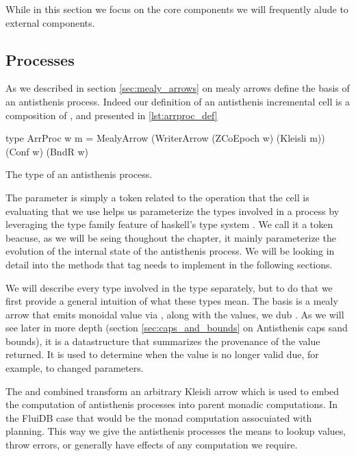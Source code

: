 While in this section we focus on the core components we will
frequently alude to external components.

\subsection{Processes}

As we described in section \ref{sec:mealy_arrows} on mealy arrows
define the basis of an antisthenis process. Indeed our definition of
an antisthenis incremental cell is a composition of ,
 and  presented in
\ref{lst:arrproc_def}

\begin{code}
\begin{haskellcode}
type ArrProc w m =
  MealyArrow (WriterArrow (ZCoEpoch w) (Kleisli m))
  (Conf w) (BndR w)
\end{haskellcode}
\label{lst:arrproc_def}
\caption{The type of an antisthenis process.}
\end{code}

The  parameter is simply a token related to the operation that
the cell is evaluating that we use helps us parameterize the types
involved in a process by leveraging the type family feature of
haskell's type system \cite{AssociatedTypeSynonyms}. We call it a
 token beacuse, as we will be seing thoughout the
chapter, it mainly parameterize the evolution of the internal state of
the antisthenis process. We will be looking in detail into the methods
that  tag needs to implement in the following
sections.

We will describe every type involved in the  type
separately, but to do that we first provide a general intuition of
what these types mean. The basis is a mealy arrow that emits monoidal
value via , along with the values, we dub
.  As we will see later in more depth (section
\ref{sec:caps_and_bounds} on Antisthenis caps sand bounds), it is a
datastructure that summarizes the provenance of the value returned. It
is used to determine when the value is no longer valid due, for
example, to changed parameters.

The  and  combined transform an
arbitrary Kleisli arrow which is used to embed the computation of
antisthenis processes into parent monadic computations. In the FluiDB
case that would be the monad computation assocuiated with
planning. This way we give the antisthenis processes the means to
lookup values, throw errors, or generally have effects of any
computation we require.

